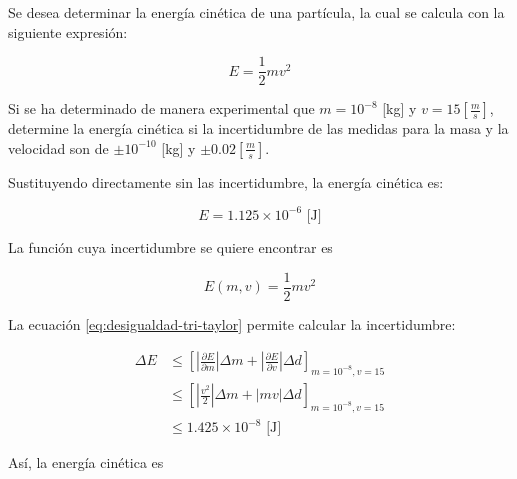 \begin{ex}
    
    Se desea determinar la energía cinética de una partícula, la cual se
    calcula con la siguiente expresión:

    \begin{equation*}
        E = \frac{1}{2} m v^2
    \end{equation*}

    Si se ha determinado de manera experimental que \(m = 10^{-8}\) [kg] y $v
    = 15 [\frac{m}{s}]$, determine la energía cinética si la incertidumbre
    de las medidas para la masa y la velocidad son de $\pm 10^{-10}$ [kg] y
    $\pm 0.02 [\frac{m}{s}]$.

    \begin{solution}

        Sustituyendo directamente sin las incertidumbre, la energía
        cinética es:

        \begin{equation*}
            E = 1.125 \times 10^{-6} \text{ [J]}
        \end{equation*}

        La función cuya incertidumbre se quiere encontrar es

        \begin{equation*}
            E(m, v) = \frac{1}{2} m v^2
        \end{equation*}

        La ecuación \ref{eq:desigualdad-tri-taylor} permite calcular la
        incertidumbre:

        \begin{align*}
            \Delta E &\leq \left[ \left| \frac{\partial E}{\partial m}
            \right| \Delta m + \left| \frac{\partial E}{\partial v}
        \right| \Delta d \right]_{m = 10^{-8}, v = 15}\\
                 &\leq \left[ \left| \frac{v^2}{2}
            \right| \Delta m + \left| m v \right| \Delta d 
        \right]_{m = 10^{-8}, v = 15} \\
                 &\leq 1.425 \times 10^{-8} \text{ [J]}
        \end{align*}

        Así, la energía cinética es

        \begin{center}
        \end{center}

    \end{solution}
\end{ex}
